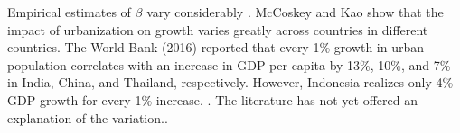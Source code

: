 \cite{GET_TerrysDissertation, GET_PaulsBook}


Empirical estimates of $\beta$ vary considerably\cite{rosenthalEvidenceNatureSources2004}\cite{bettencourtIntroductionUrbanScience2021} \cite{loboUrbanScalingProduction2013}. 
McCoskey and Kao \cite{mccoskeyPanelDataInvestigation}show that  the impact of urbanization on growth varies greatly across countries in different countries.
The World Bank (2016) reported that every 1\% growth in urban population correlates with an increase in GDP per capita by 13\%, 10\%, and 7\% in India, China, and Thailand, respectively.  However, Indonesia realizes only 4\% GDP growth for every 1\% increase. \cite{haryantotriRelationshipUrbanizationEducation2021}. The literature has not yet offered an explanation  of the variation.\cite{loboUrbanScalingProduction2013}.

% 




